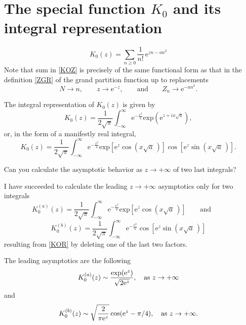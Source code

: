 \documentclass[12pt]{article}
\numberwithin{equation}{section}
\newcommand{\be}{\begin{equation}}
\newcommand{\ee}{\end{equation}}
\newcommand{\e}{\mbox{e}}
\newcommand {\MM}[1]{\qquad\mbox{#1}\qquad}
\begin{document}
	
	\pagebreak
	\section{The special function $K_0$ and its integral representation}
	
	\be\label{KOZ}
	K_0(z)=\sum_{n\ge0}\frac1{n!}\,\e^{zn-an^2}
	\ee
	Note that sum in \eqref{KOZ} is precisely of the same functional form as that in the definition \eqref{ZGR} of the grand partition function up to replacements
	\be
	N\to n,\qquad z\to\e^{-z},\MM{and}Z_n\to\e^{-an^2}.
	\ee
	
	The integral representation of $K_0(z)$ is given by
	\be
	K_0(z)=\frac1{2\sqrt\pi}\int_{-\infty}^\infty\e^{-\frac{x^2}4}
	\mbox{exp}\left(\e^{z+ix\sqrt a}\right),
	\ee
	or, in the form of a manifestly real integral,
	\be\label{KOR}
	K_0(z)=\frac1{2\sqrt\pi}\int_{-\infty}^\infty\e^{-\frac{x^2}4}
	\mbox{exp}\left[\e^z\cos(x\sqrt a\,)\right]
	\cos\left[\e^z\sin(x\sqrt a\,)\right].
	\ee
	
	Can you calculate the asymptotic behavior as $z\to+\infty$ of two last integrals?
	
	I have succeeded to calculate the leading $z\to+\infty$ asymptotics only for two integrals
	\be
	K_0^{(a)}(z) = \frac1{2\sqrt\pi} \int_{-\infty}^\infty\e^{-\frac{x^2}4}
	\mbox{exp}\left[\e^z\cos(x\sqrt a\,)\right]\qquad\mbox{and}\qquad
	\ee
	\be
	K_0^{(b)}(z) = \frac1{2\sqrt\pi} \int_{-\infty}^\infty\e^{-\frac{x^2}4}
	\cos\left[\e^z\sin(x\sqrt a\,)\right]
	\ee
	resulting from \eqref{KOR} by deleting one of the last two factors.
	
	The leading asymptotics are the following
	\begin{equation}
		K_0^{(a)}(z) \sim \frac{\exp({\rm e}^z)}{\sqrt{2 {\rm e}^z}}, \quad \text{as } z \to +\infty
	\end{equation}
	and
	\begin{equation}
		K_0^{(b)}(z) \sim \sqrt{\frac{2}{\pi {\rm e}^z}} \cos({\rm e}^z - \pi/4), \quad \text{as } z \to +\infty.
	\end{equation}
	
	
	\appendix
	
	\pagebreak
	
\end{document}
